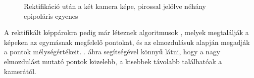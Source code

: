 \begin{figure}[tbh]
  \centering
{}
  \caption{Rektifikáció után a két kamera képe, pirossal jelölve néhány epipoláris egyenes \label{fig:stereo-calibration-after}}
\end{figure}

A rektifikált képpárokra pedig már léteznek algoritmusok \cite{SGBM, stereo-var}, melyek megtalálják a képeken az egymásnak megfelelő pontokat, és az elmozdulásuk alapján megadják a pontok mélységértékeit. . ábra segítségével könnyű látni, hogy a nagy elmozdulást mutató pontok közelebb, a kisebbek távolabb találhatóak a kamerától.

